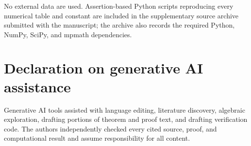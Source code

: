 No external data are used.  Assertion-based Python scripts reproducing every
numerical table and constant are included in the supplementary source archive
submitted with the manuscript; the archive also records the required Python,
NumPy, SciPy, and mpmath dependencies.

\section*{Declaration on generative AI assistance}

Generative AI tools assisted with language editing, literature discovery,
algebraic exploration, drafting portions of theorem and proof text, and
drafting verification code.  The authors independently checked every cited
source, proof, and computational result and assume responsibility for all
content.

